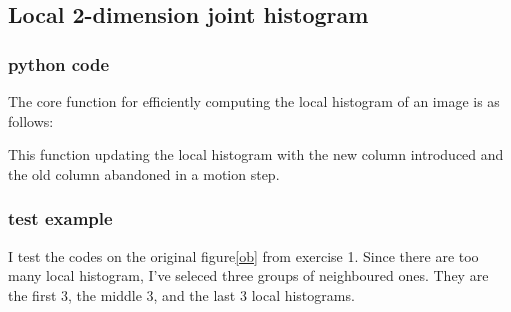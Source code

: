 \documentclass{article}
\begin{document}
\subsection{Local 2-dimension joint histogram}
\subsubsection{python code}

The core function for efficiently computing the local histogram of an image is as follows:
     

    This function updating the local histogram with the new column introduced
    and the old column abandoned in a motion step.
\subsubsection{test example}
    I test the codes on the original figure\ref{ob} from exercise 1.
    Since there are too many local histogram, I've seleced three groups 
    of neighboured ones. They are the first 3, the middle 3, and the last 3 local histograms.
    
\end{document}
